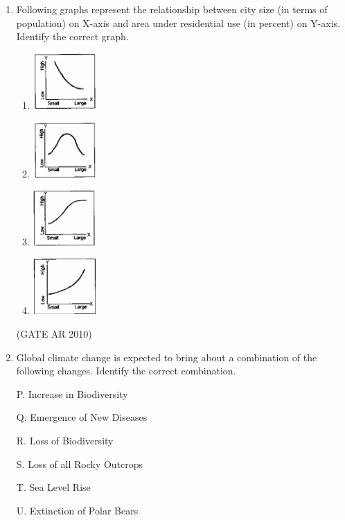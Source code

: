 \documentclass[journal]{IEEEtran}
\begin{document}
\begin{enumerate}
\item Following graphs represent the relationship between city size (in terms of population) on X-axis and area under residential use (in percent) on Y-axis. Identify the correct graph.
\begin{multicols}{2}
\begin{enumerate}
\item \includegraphics[width=0.2\textwidth]{Fig 1.png}
\item \includegraphics[width=0.2\textwidth]{Fig 2.png}
\item \includegraphics[width=0.2\textwidth]{Fig 3.png}
\item \includegraphics[width=0.2\textwidth]{Fig 4.png}
\end{enumerate}
\end{multicols}
\hfill (GATE AR 2010)

\item Global climate change is expected to bring about a combination of the following changes. Identify the correct combination.

P. Increase in Biodiversity

Q. Emergence of New Diseases

R. Loss of Biodiversity

S. Loss of all Rocky Outcrops

T. Sea Level Rise

U. Extinction of Polar Bears


\end{enumerate}
\end{document}
